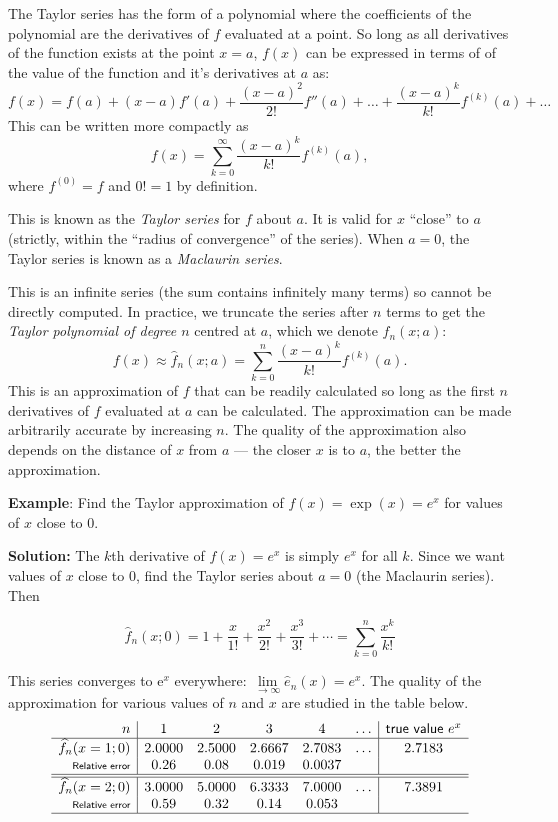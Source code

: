 The Taylor series has the form of a polynomial where the coefficients of the polynomial are the derivatives of $f$ evaluated at a point. So long as all  derivatives of the function exists at the point $x = a$, $f(x)$ can be expressed in terms of of the value of the function and it's derivatives at $a$ as:
\[ f(x) = f(a) + (x-a)f'(a) + \frac{(x-a)^2}{2!}f''(a) + \ldots + \frac{(x-a)^k}{k!}f^{(k)}(a) + \ldots \]
This can be written more compactly as 
\[ f(x) = \sum_{k = 0}^{\infty} \frac{(x-a)^k}{k!}f^{(k)}(a), \]
where $f^{(0)} = f$ and $0! = 1$ by definition.  

This is known as the {\em Taylor series} for $f$ about $a$.  It is valid for $x$ ``close'' to $a$ (strictly, within the ``radius of convergence'' of the series).   When $a = 0$, the Taylor series  is known as a {\em Maclaurin series}.

This is an infinite series (the sum contains infinitely many terms) so cannot be directly computed.  In practice, we truncate the series after $n$ terms to get  the {\em Taylor polynomial of degree $n$} centred at $a$, which we denote $\hat f_n(x;a)$:
\[ f(x) \approx \hat f_n(x;a) = \sum_{k = 0}^{n} \frac{(x-a)^k}{k!}f^{(k)}(a). \]
This is an approximation of $f$ that can be readily calculated so long as the first $n$ derivatives of $f$ evaluated at $a$ can be calculated.  The approximation can be made arbitrarily accurate by increasing $n$.  The quality of the approximation also depends on the distance of $x$ from $a$ --- the closer $x$ is to $a$, the better the approximation.

{\bf Example}: Find the Taylor approximation of $f(x)=\exp(x) =  {e}^x$ for values of  $x$ close to 0. 

{\bf Solution:} The $k$th derivative of  $f(x) = e^x$ is simply $e^x$ for all $k$.  Since we want values of $x$ close to 0, find the Taylor series about  $a = 0$ (the Maclaurin series).   Then 
 
\[ \widehat{f}_n(x;0) = 1 + \frac{x}{1!} + \frac{x^2}{2!} + \frac{x^3}{3!} + \cdots = \sum\limits_{k=0}^{n}\frac{x^k}{k!} \]

 This  series converges to $\mathrm{e}^x$ everywhere: $\lim\limits_{\rightarrow\infty} \widehat{e}_n(x)= e^x$.  The quality of the approximation for various values of $n$ and $x$ are studied in the table below.
\[
\begin{array}{r|ccccc|c}
n & 1 & 2 & 3 & 4 & \ldots & \textsf{true value }e^x\\ \hline
\widehat{f}_n(x=1;0) & 2.0000 & 2.5000 & 2.6667 & 2.7083 & \ldots & {2.7183}\\
\textsf{\scriptsize Relative error} & 0.26 & 0.08 & 0.019 &  0.0037 & &\\ \hline\hline
\widehat{f}_n(x=2;0) & 3.0000 & 5.0000 & 6.3333 & 7.0000 & \ldots  & {7.3891}\\
\textsf{\scriptsize Relative error} & 0.59 & 0.32 & 0.14 &  0.053 & &\\ \hline
\end{array}
\]

